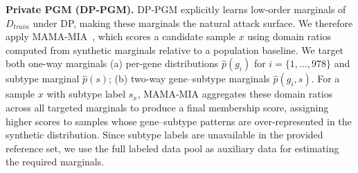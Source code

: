 \documentclass[11pt]{article}
\begin{document}
\vspace{0.3em}
\noindent
\textbf{Private PGM (DP-PGM).} DP-PGM explicitly learns low-order marginals of $D_{{train}}$ under DP, making these marginals the natural attack surface. We therefore apply MAMA-MIA~\cite{golob2024privacy}, which scores a candidate sample $x$ using domain ratios computed from synthetic marginals relative to a population baseline. We target both one-way marginals (a) per-gene distributions $\hat{p}(g_i)$ for $i=\{1,\ldots,978\}$ and subtype marginal $\hat{p}(s)$; (b) two-way gene--subtype marginals $\hat{p}(g_i, s)$. For a sample $x$ with subtype label $s_x$, MAMA-MIA aggregates these domain ratios across all targeted marginals to produce a final membership score, assigning higher scores to samples whose gene--subtype patterns are over-represented in the synthetic distribution. Since subtype labels are unavailable in the provided reference set, we use the full labeled data pool as auxiliary data for estimating the required marginals.







\end{document}
